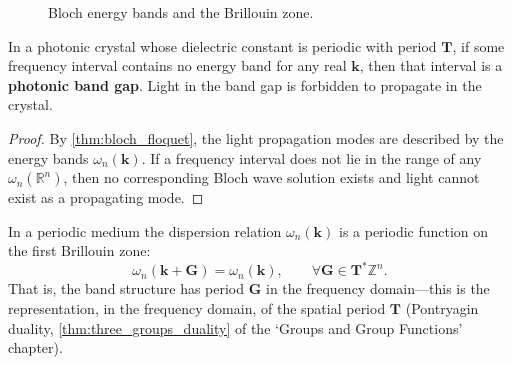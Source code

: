 \begin{figure}[htbp]
\centering
{}
\caption{Bloch energy bands and the Brillouin zone.}
\label{fig:bloch_bands}
\end{figure}

\begin{corollary}\label{cor:photonic_bandgap}
In a photonic crystal whose dielectric constant is periodic with period $\mathbf{T}$, if some frequency interval contains no energy band for any real $\mathbf{k}$, then that interval is a \textbf{photonic band gap}. Light in the band gap is forbidden to propagate in the crystal.
\end{corollary}

\begin{proof}
By \cref{thm:bloch_floquet}, the light propagation modes are described by the energy bands $\omega_n(\mathbf{k})$. If a frequency interval does not lie in the range of any $\omega_n(\mathbb{R}^n)$, then no corresponding Bloch wave solution exists and light cannot exist as a propagating mode.
\end{proof}

\begin{property}\label{prop:dispersion_period}
In a periodic medium the dispersion relation $\omega_n(\mathbf{k})$ is a periodic function on the first Brillouin zone:
\[
\omega_n(\mathbf{k}+\mathbf{G}) = \omega_n(\mathbf{k}), \qquad \forall \mathbf{G}\in\mathbf{T}^*\mathbb{Z}^n.
\]
That is, the band structure has period $\mathbf{G}$ in the frequency domain---this is the representation, in the frequency domain, of the spatial period $\mathbf{T}$ (Pontryagin duality, \cref{thm:three_groups_duality} of the `Groups and Group Functions' chapter).
\end{property}

